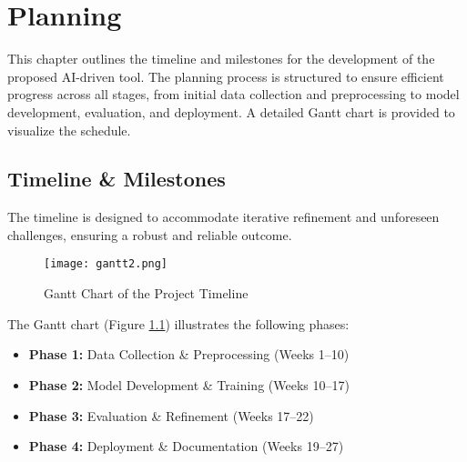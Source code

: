 
%

\chapter{Planning}
\label{cha:Planning}

This chapter outlines the timeline and milestones for the development of the proposed AI-driven tool. The planning process is structured to ensure efficient progress across all stages, from initial data collection and preprocessing to model development, evaluation, and deployment. A detailed Gantt chart is provided to visualize the schedule.
\section{Timeline \& Milestones}
The timeline is designed to accommodate iterative refinement and unforeseen challenges, ensuring a robust and reliable outcome.

\begin{figure}[h]
    \centering
    \texttt{[image: gantt2.png]} 
    \caption{Gantt Chart of the Project Timeline}
    \label{fig:gantt}
\end{figure}

The Gantt chart (Figure \ref{fig:gantt}) illustrates the following phases:
\begin{itemize}
\item \textbf{Phase 1:} Data Collection \& Preprocessing (Weeks 1–10)
\item \textbf{Phase 2:} Model Development \& Training (Weeks 10–17)
\item \textbf{Phase 3:} Evaluation \& Refinement (Weeks 17–22)
\item \textbf{Phase 4:} Deployment \& Documentation (Weeks 19–27)
\end{itemize}